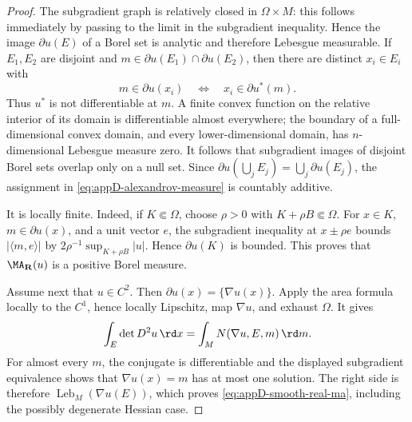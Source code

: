 \begin{proof}
The subgradient graph is relatively closed in \(\Omega\times M\): this
follows immediately by passing to the limit in the subgradient inequality.
Hence the image
\(\partial u(E)\) of a Borel set is analytic and therefore Lebesgue
measurable.  If \(E_1,E_2\) are disjoint and
\(m\in\partial u(E_1)\cap\partial u(E_2)\), then there are distinct
\(x_i\in E_i\) with
\[
 m\in\partial u(x_i)
 \quad\Longleftrightarrow\quad
 x_i\in\partial u^*(m).
\]
Thus \(u^*\) is not differentiable at \(m\).  A finite convex function on
the relative interior of its domain is differentiable almost everywhere;
the boundary of a full-dimensional convex domain, and every
lower-dimensional domain, has \(n\)-dimensional Lebesgue measure zero.
It follows that subgradient images of disjoint Borel sets overlap only on
a null set.  Since
\(\partial u(\bigcup_jE_j)=\bigcup_j\partial u(E_j)\), the assignment in
\eqref{eq:appD-alexandrov-measure} is countably additive.

It is locally finite.  Indeed, if \(K\Subset\Omega\), choose
\(\rho>0\) with \(K+\rho B\Subset\Omega\).  For \(x\in K\),
\(m\in\partial u(x)\), and a unit vector \(e\), the subgradient inequality
at \(x\pm\rho e\) bounds \(|\langle m,e\rangle|\) by
\(2\rho^{-1}\sup_{K+\rho B}|u|\).  Hence \(\partial u(K)\) is bounded.
This proves that \(\MA_{\mathbf R}(u)\) is a positive Borel measure.

Assume next that \(u\in C^2\).  Then
\(\partial u(x)=\{\nabla u(x)\}\).  Apply the area formula
\cite[Theorem~3.8]{EvansGariepy} locally to the \(C^1\), hence locally
Lipschitz, map \(\nabla u\), and exhaust \(\Omega\).  It gives
\[
 \int_E\det D^2u\,\rd x
 =\int_M N(\nabla u,E,m)\,\rd m.
\]
For almost every \(m\), the conjugate is differentiable and the displayed
subgradient equivalence shows that \(\nabla u(x)=m\) has at most one
solution.  The right side is therefore
\(\operatorname{Leb}_M(\nabla u(E))\), which proves
\eqref{eq:appD-smooth-real-ma}, including the possibly degenerate Hessian
case.


\end{proof}
